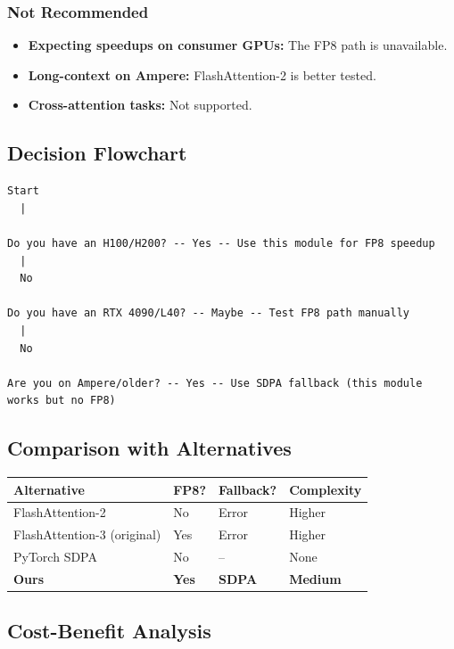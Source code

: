 \subsubsection{Not Recommended}

\begin{itemize}
\item \textbf{Expecting speedups on consumer GPUs:} The FP8 path is unavailable.
\item \textbf{Long-context on Ampere:} FlashAttention-2 is better tested.
\item \textbf{Cross-attention tasks:} Not supported.

\end{itemize}
\subsection{Decision Flowchart}

\begin{lstlisting}
Start
  |
   
Do you have an H100/H200? -- Yes -- Use this module for FP8 speedup
  |
  No
   
Do you have an RTX 4090/L40? -- Maybe -- Test FP8 path manually
  |
  No
   
Are you on Ampere/older? -- Yes -- Use SDPA fallback (this module works but no FP8)
\end{lstlisting}

\subsection{Comparison with Alternatives}

\begin{table}[H]
\centering
\small
\begin{tabular}{llll}
\toprule
\textbf{Alternative} & \textbf{FP8?} & \textbf{Fallback?} & \textbf{Complexity} \\
\midrule
FlashAttention-2 & No & Error & Higher \\
FlashAttention-3 (original) & Yes & Error & Higher \\
PyTorch SDPA & No & -- & None \\
\textbf{Ours} & \textbf{Yes} & \textbf{SDPA} & \textbf{Medium} \\
\bottomrule
\end{tabular}
\end{table}

\subsection{Cost-Benefit Analysis}

